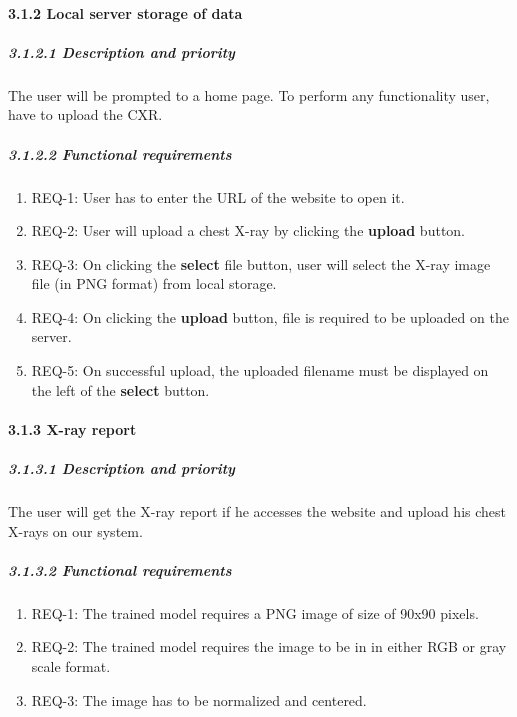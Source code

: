 \documentclass{article} %
\begin{document}
\noindent 
\paragraph{3.1.2  Local server storage of data}

\noindent 
\subparagraph{3.1.2.1 Description and priority}

\noindent The user will be prompted to a home page. To perform any functionality user, have to upload the CXR.

\noindent 
\subparagraph{3.1.2.2 Functional requirements}

\begin{enumerate}
\item  REQ-1: User has to enter the URL of the website to open it.

\item  REQ-2: User will upload a chest X-ray by clicking the \textbf{upload} button.

\item  REQ-3: On clicking the \textbf{select} file button, user will select the X-ray image file (in PNG format) from local storage.

\item  REQ-4: On clicking the \textbf{upload} button, file is required to be uploaded on the server.

\item  REQ-5: On successful upload, the uploaded filename must be displayed on the left of the \textbf{select} button.
\end{enumerate}

\noindent 
\paragraph{3.1.3 X-ray report}

\noindent 
\subparagraph{3.1.3.1 Description and priority}

\noindent The user will get the X-ray report if he accesses the website and upload his chest X-rays on our system.

\noindent 
\subparagraph{3.1.3.2 Functional requirements}

\begin{enumerate}
\item \textbf{ }REQ-1: The trained model requires a PNG image of size of 90x90 pixels.

\item  REQ-2: The trained model requires the image to be in in either RGB or gray scale format.

\item  REQ-3: The image has to be normalized and centered.
\end{enumerate}
\end{document}
